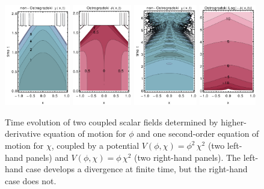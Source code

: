 \documentclass[a4paper,oneside,openany,11pt]{memoir}
\numberwithin{equation}{section} %
\begin{document}
%
\begin{figure}
  \centering
  \includegraphics[width=0.255\textwidth]{scalarField_divergenceAtFiniteTime_nonOstrogradskiMode.pdf}
  \includegraphics[width=0.23\textwidth]{scalarField_divergenceAtFiniteTime_ostrogradskiMode.pdf}
  \hfill\vline\hfill
  \includegraphics[width=0.245\textwidth]{scalarField_noDivergenceAtFiniteTime_nonOstrogradskiMode.pdf}
  \includegraphics[width=0.22\textwidth]{scalarField_noDivergenceAtFiniteTime_ostrogradskiMode.pdf}
  \caption{\label{fig:scalarFieldExample}
  Time evolution of two coupled scalar fields determined by higher-derivative equation of motion for $\phi$ and one second-order equation of motion for $\chi$, coupled by a potential $V(\phi,\chi) = \phi^2\,\chi^2$ (two left-hand panels) and $V(\phi,\chi) = \phi\,\chi^2$ (two right-hand panels). The left-hand case develops a divergence at finite time, but the right-hand case does not.}
\end{figure}
%
\end{document}
